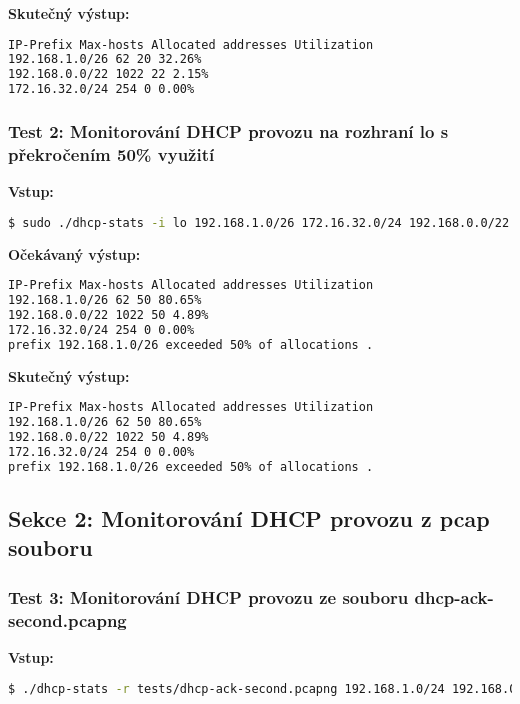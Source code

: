 \documentclass[a4paper, 11pt]{article}
\begin{document}
    \textbf{Skutečný výstup:}

    \begin{lstlisting}[language=bash]
IP-Prefix Max-hosts Allocated addresses Utilization
192.168.1.0/26 62 20 32.26%
192.168.0.0/22 1022 22 2.15%
172.16.32.0/24 254 0 0.00%
    \end{lstlisting}

    \subsubsection{Test 2: Monitorování DHCP provozu na rozhraní lo s překročením 50\% využití}

    \textbf{Vstup:}

    \begin{lstlisting}[language=bash]
$ sudo ./dhcp-stats -i lo 192.168.1.0/26 172.16.32.0/24 192.168.0.0/22
    \end{lstlisting}

    \textbf{Očekávaný výstup:}

    \begin{lstlisting}[language=bash]
IP-Prefix Max-hosts Allocated addresses Utilization
192.168.1.0/26 62 50 80.65%
192.168.0.0/22 1022 50 4.89%
172.16.32.0/24 254 0 0.00%
prefix 192.168.1.0/26 exceeded 50% of allocations .
    \end{lstlisting}

    \textbf{Skutečný výstup:}

    \begin{lstlisting}[language=bash]
IP-Prefix Max-hosts Allocated addresses Utilization
192.168.1.0/26 62 50 80.65%
192.168.0.0/22 1022 50 4.89%
172.16.32.0/24 254 0 0.00%
prefix 192.168.1.0/26 exceeded 50% of allocations .
    \end{lstlisting}

    \subsection{Sekce 2: Monitorování DHCP provozu z pcap souboru}

    \subsubsection{Test 3: Monitorování DHCP provozu ze souboru dhcp-ack-second.pcapng}

    \textbf{Vstup:}

    \begin{lstlisting}[language=bash]
$ ./dhcp-stats -r tests/dhcp-ack-second.pcapng 192.168.1.0/24 192.168.0.0/22 172.16.32.0/24
    \end{lstlisting}
\end{document}
